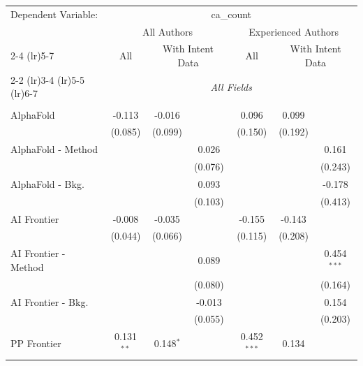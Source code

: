 \begingroup
\centering
\begin{tabular}{lcccccc}
   \tabularnewline \midrule \midrule
   Dependent Variable: & \multicolumn{6}{c}{ca\_count}\\
 & \multicolumn{3}{c}{All Authors} & \multicolumn{3}{c}{Experienced Authors} \\
\cmidrule(lr){2-4} \cmidrule(lr){5-7}
 & \multicolumn{1}{c}{All} & \multicolumn{2}{c}{With Intent Data} & \multicolumn{1}{c}{All} & \multicolumn{2}{c}{With Intent Data} \\
\cmidrule(lr){2-2} \cmidrule(lr){3-4} \cmidrule(lr){5-5} \cmidrule(lr){6-7}
 & \multicolumn{6}{c}{\textit{All Fields}} \\ \\
   AlphaFold            & -0.113       & -0.016       &               & 0.096         & 0.099   &   \\   
                        & (0.085)      & (0.099)      &               & (0.150)       & (0.192) &   \\   
   AlphaFold - Method   &              &              & 0.026         &               &         & 0.161\\   
                        &              &              & (0.076)       &               &         & (0.243)\\   
   AlphaFold - Bkg.     &              &              & 0.093         &               &         & -0.178\\   
                        &              &              & (0.103)       &               &         & (0.413)\\   
   AI Frontier          & -0.008       & -0.035       &               & -0.155        & -0.143  &   \\   
                        & (0.044)      & (0.066)      &               & (0.115)       & (0.208) &   \\   
   AI Frontier - Method &              &              & 0.089         &               &         & 0.454$^{***}$\\   
                        &              &              & (0.080)       &               &         & (0.164)\\   
   AI Frontier - Bkg.   &              &              & -0.013        &               &         & 0.154\\   
                        &              &              & (0.055)       &               &         & (0.203)\\   
   PP Frontier          & 0.131$^{**}$ & 0.148$^{*}$  &               & 0.452$^{***}$ & 0.134   &   \\   

\end{tabular}
